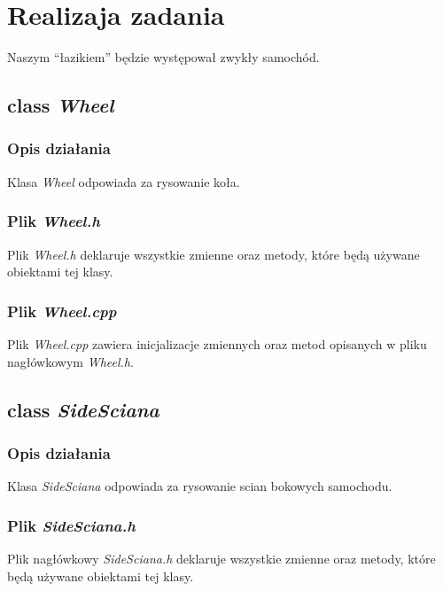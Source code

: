 \documentclass[a4paper, 12pt]{report}
\begin{document}
\section{Realizaja zadania}

Naszym ``łazikiem'' będzie występował zwykły samochód.

\subsection{class \emph{Wheel}}
\subsubsection{Opis działania}

Klasa \emph{Wheel} odpowiada za rysowanie koła.

\subsubsection{Plik \emph{Wheel.h}}

Plik \emph{Wheel.h} deklaruje wszystkie zmienne oraz metody, które będą używane obiektami tej klasy.



\subsubsection{Plik \emph{Wheel.cpp}}

Plik \emph{Wheel.cpp} zawiera inicjalizacje zmiennych oraz metod opisanych w pliku nagłówkowym \emph{Wheel.h}.



\subsection{class \emph{SideSciana}}
\subsubsection{Opis działania}

Klasa \emph{SideSciana} odpowiada za rysowanie scian bokowych samochodu.

\subsubsection{Plik \emph{SideSciana.h}}

Plik nagłówkowy \emph{SideSciana.h} deklaruje wszystkie zmienne oraz metody, które będą używane obiektami tej klasy.
\end{document}
